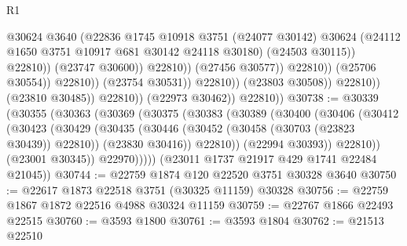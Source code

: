 \begin{lexlean}{R1}
\begin{coremodule}
                                                  @30624
                                                  @3640
                                                  (@22836
                                                    @1745
                                                    @10918
                                                    @3751
                                                    (@24077 @30142)
                                                    @30624
                                                    (@24112
                                                      @1650
                                                      @3751
                                                      @10917
                                                      @681
                                                      @30142
                                                      @24118
                                                      @30180)
                                                    (@24503 @30115))
                                                  @22810))
                                              (@23747 @30600))
                                            @22810))
                                        (@27456 @30577))
                                      @22810))
                                  (@25706 @30554))
                                @22810))
                            (@23754 @30531))
                          @22810))
                      (@23803 @30508))
                    @22810))
                (@23810 @30485))
              @22810))
          (@22973 @30462))
        @22810))
@30738 := @30339
    (@30355
      (@30363
        (@30369
          (@30375
            (@30383
              (@30389
                (@30400
                  (@30406
                    (@30412
                      (@30423
                        (@30429
                          (@30435
                            (@30446
                              (@30452 (@30458 (@30703 (@23823 @30439)) @22810))
                              (@23830 @30416))
                            @22810))
                        (@22994 @30393))
                      @22810))
                  (@23001 @30345))
                @22970)))))
      (@23011 @1737 @21917 @429 @1741 @22484 @21045))
@30744 := @22759 @1874 @120 @22520 @3751 @30328 @3640
@30750 := @22617 @1873 @22518 @3751 (@30325 @11159) @30328
@30756 := @22759 @1867 @1872 @22516 @4988 @30324 @11159
@30759 := @22767 @1866 @22493 @22515
@30760 := @3593 @1800
@30761 := @3593 @1804
@30762 := @21513 @22510

\end{coremodule}
\end{lexlean}
